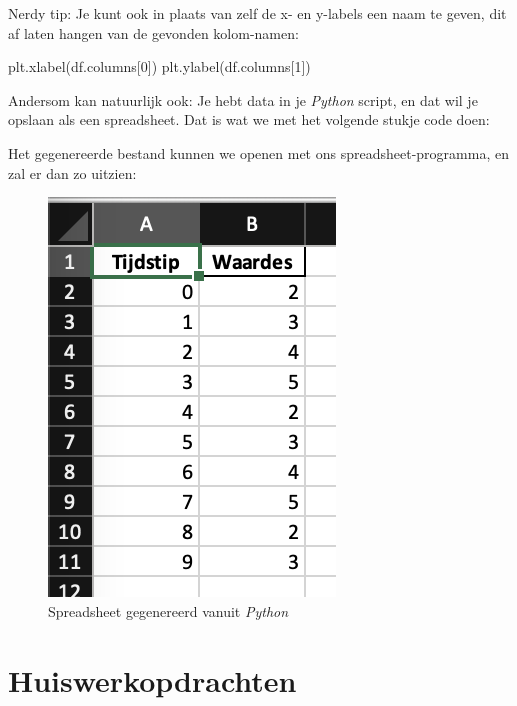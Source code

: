 \begin{remark}
Nerdy tip: Je kunt ook in plaats van zelf de x- en y-labels een naam te geven, dit af laten hangen van de gevonden kolom-namen:
\begin{python}
plt.xlabel(df.columns[0])
plt.ylabel(df.columns[1])
\end{python}
\end{remark}

Andersom kan natuurlijk ook: Je hebt data in je \textit{Python} script, en dat wil je opslaan als een spreadsheet. Dat is wat we met het volgende stukje code doen:


\newpage
Het gegenereerde bestand kunnen we openen met ons spreadsheet-programma, en zal er dan zo uitzien:

\begin{figure}[!ht]
\centering\includegraphics[scale=0.7]{Pictures/chapter07/excel2.png}
\caption{Spreadsheet gegenereerd vanuit \textit{Python}}
\label{fig:excel2} %
\end{figure}

\newpage

\section{Huiswerkopdrachten}
\vspace{5mm} 

